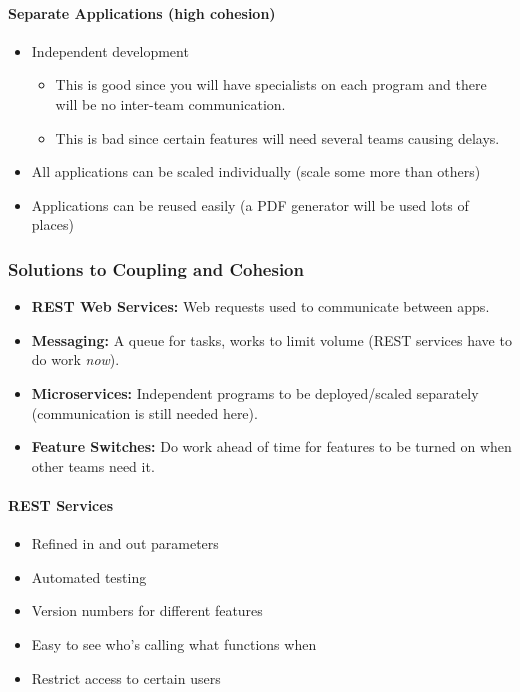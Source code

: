 \paragraph{Separate Applications (high cohesion)}\label{par:separate_applications_high_cohesion_}

\begin{itemize}
    \item Independent development
        \begin{itemize}
            \item This is good since you will have specialists on each program and there will be no inter-team communication.
            \item This is bad since certain features will need several teams causing delays.
        \end{itemize}
    \item All applications can be scaled individually (scale some more than others)
    \item Applications can be reused easily (a PDF generator will be used lots of places)
\end{itemize}

\subsubsection{Solutions to Coupling and Cohesion}\label{ssub:solutions_to_coupling_and_cohesion}

\begin{itemize}
    \item \textbf{REST Web Services:} Web requests used to communicate between apps.
    \item \textbf{Messaging:} A queue for tasks, works to limit volume (REST services have to do work \emph{now}).
    \item \textbf{Microservices:} Independent programs to be deployed/scaled separately (communication is still needed here).
    \item \textbf{Feature Switches:} Do work ahead of time for features to be turned on when other teams need it. 
\end{itemize}

\paragraph{REST Services}\label{par:rest_services}

\begin{itemize}
    \item Refined in and out parameters
    \item Automated testing
    \item Version numbers for different features
    \item Easy to see who's calling what functions when
    \item Restrict access to certain users
\end{itemize}

